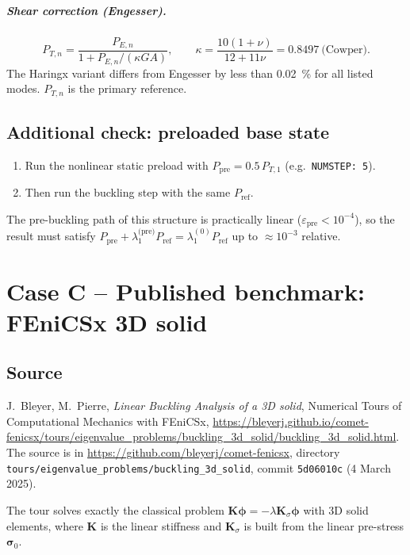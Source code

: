 \documentclass[11pt,a4paper]{report}
\newcommand{\K}{\mathbf{K}}
\begin{document}
\paragraph{Shear correction (Engesser).}
\begin{equation}
  P_{T,n} = \frac{P_{E,n}}{1+P_{E,n}/(\kappa G A)},\qquad
  \kappa = \frac{10(1+\nu)}{12+11\nu} = 0.8497 \ \text{(Cowper)} .
\end{equation}
The Haringx variant differs from Engesser by less than \SI{0.02}{\percent}
for all listed modes. $P_{T,n}$ is the primary reference.

\section{Additional check: preloaded base state}
\begin{enumerate}
\item Run the nonlinear static preload with $P_\text{pre} = 0.5\,P_{T,1}$
  (e.g.\ \texttt{NUMSTEP: 5}).
\item Then run the buckling step with the same $P_\text{ref}$.
\end{enumerate}
The pre-buckling path of this structure is practically linear
($\varepsilon_\text{pre}<10^{-4}$), so the result must satisfy
$P_\text{pre} + \lambda_1^{\text{(pre)}}P_\text{ref} = \lambda_1^{(0)}P_\text{ref}$
up to $\approx 10^{-3}$ relative.

\chapter{Case C -- Published benchmark: FEniCSx 3D solid}
\label{ch:fenics}

\section{Source}
J.~Bleyer, M.~Pierre, \emph{Linear Buckling Analysis of a 3D solid},
Numerical Tours of Computational Mechanics with FEniCSx,
\url{https://bleyerj.github.io/comet-fenicsx/tours/eigenvalue_problems/buckling_3d_solid/buckling_3d_solid.html}.
The source is in \url{https://github.com/bleyerj/comet-fenicsx},
directory \texttt{tours/eigenvalue\_problems/buckling\_3d\_solid},
commit \texttt{5d06010c} (4 March 2025).

The tour solves exactly the classical problem $\K\bm{\phi} = -\lambda\K_\sigma\bm{\phi}$
with 3D solid elements, where $\K$ is the linear stiffness and $\K_\sigma$ is
built from the linear pre-stress $\bm{\sigma}_0$.
\end{document}
